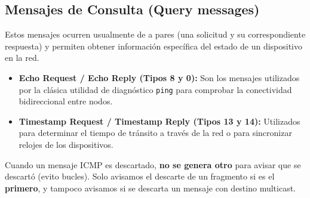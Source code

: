\subsection{Mensajes de Consulta (Query messages)}
Estos mensajes ocurren usualmente de a pares (una solicitud y su correspondiente respuesta) y permiten obtener información específica del estado de un dispositivo en la red.

\begin{itemize}[label=\textcolor{acento}{$\bullet$}]
    \item \textbf{Echo Request / Echo Reply (Tipos 8 y 0):} Son los mensajes utilizados por la clásica utilidad de diagnóstico \texttt{ping} para comprobar la conectividad bidireccional entre nodos.
    \item \textbf{Timestamp Request / Timestamp Reply (Tipos 13 y 14):} Utilizados para determinar el tiempo de tránsito a través de la red o para sincronizar relojes de los dispositivos.
\end{itemize}


Cuando un mensaje ICMP es descartado, \textbf{no se genera otro} para avisar que se descartó (evito bucles). Solo avisamos el descarte de un fragmento si es el \textbf{primero}, y tampoco avisamos si se descarta un mensaje con destino multicast.
